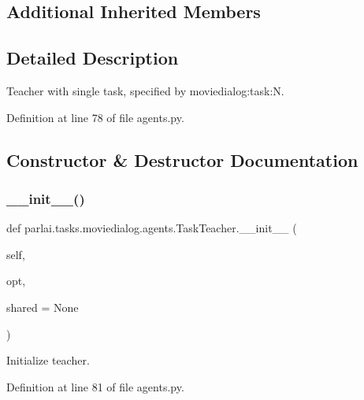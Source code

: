 \subsection*{Additional Inherited Members}


\subsection{Detailed Description}
\begin{DoxyVerb}Teacher with single task, specified by moviedialog:task:N.\end{DoxyVerb}
 

Definition at line 78 of file agents.\+py.



\subsection{Constructor \& Destructor Documentation}
\mbox{\label{classparlai_1_1tasks_1_1moviedialog_1_1agents_1_1TaskTeacher_a3cc846c9e289de305215cc30b6e1f1b0}} 
\subsubsection{\texorpdfstring{\+\_\+\+\_\+init\+\_\+\+\_\+()}{\_\_init\_\_()}}
{\footnotesize\ttfamily def parlai.\+tasks.\+moviedialog.\+agents.\+Task\+Teacher.\+\_\+\+\_\+init\+\_\+\+\_\+ (\begin{DoxyParamCaption}\item[{}]{self,  }\item[{}]{opt,  }\item[{}]{shared = {\ttfamily None} }\end{DoxyParamCaption})}

\begin{DoxyVerb}Initialize teacher.\end{DoxyVerb}
 

Definition at line 81 of file agents.\+py.



